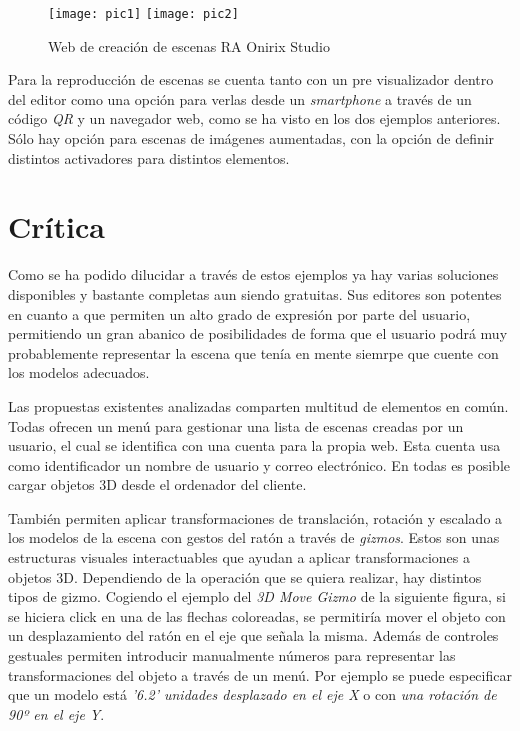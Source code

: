 \begin{figure}[h]
    \centering
    \texttt{[image: pic1]}
    \texttt{[image: pic2]}
    \caption[Aplicación Onirix Studio]{Web de creación de escenas RA Onirix Studio}
\end{figure}

Para la reproducción de escenas se cuenta tanto con un pre visualizador dentro del editor como una opción para verlas desde un \textit{smartphone} a través de un código \textit{QR} y un navegador web, como se ha visto en los dos ejemplos anteriores. Sólo hay opción para escenas de imágenes aumentadas, con la opción de definir distintos activadores para distintos elementos.

\section{Crítica}

Como se ha podido dilucidar a través de estos ejemplos ya hay varias soluciones disponibles y bastante completas aun siendo gratuitas. Sus editores son potentes en cuanto a que permiten un alto grado de expresión por parte del usuario, permitiendo un gran abanico de posibilidades de forma que el usuario podrá muy probablemente representar la escena que tenía en mente siemrpe que cuente con los modelos adecuados.

Las propuestas existentes analizadas comparten multitud de elementos en común. Todas ofrecen un menú para gestionar una lista de escenas creadas por un usuario, el cual se identifica con una cuenta para la propia web. Esta cuenta usa como identificador un nombre de usuario y correo electrónico. En todas es posible cargar objetos 3D desde el ordenador del cliente.

También permiten aplicar transformaciones de translación, rotación y escalado a los modelos de la escena con gestos del ratón a través de \textit{gizmos}. Estos son unas estructuras visuales interactuables que ayudan a aplicar transformaciones a objetos 3D. Dependiendo de la operación que se quiera realizar, hay distintos tipos de gizmo. Cogiendo el ejemplo del \textit{3D Move Gizmo} de la siguiente figura, si se hiciera click en una de las flechas coloreadas, se permitiría mover el objeto con un desplazamiento del ratón en el eje que señala la misma. Además de controles gestuales permiten introducir manualmente números para representar las transformaciones del objeto a través de un menú. Por ejemplo se puede especificar que un modelo está \textit{'6.2' unidades desplazado en el eje X} o con \textit{una rotación de 90º en el eje Y}.

